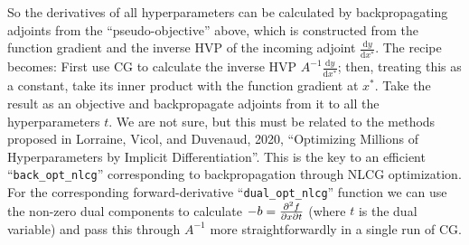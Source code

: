 \documentclass[11pt]{article}
\renewcommand{\(}{\left(}
\renewcommand{\)}{\right)}
\newcommand{\partbyby}[3]{{\partial^2 #1\over \partial #2 \partial #3}}
\newcommand{\ud}{\mathrm{d}}
\newcommand{\dby}[2]{\frac{\ud #1}{\ud #2}}
\begin{document}
So the derivatives of all hyperparameters can be calculated by
backpropagating adjoints from the ``pseudo-objective'' above, which is
constructed from the function gradient and the inverse HVP of the
incoming adjoint $\dby{y}{x^*}$. The recipe becomes: First use CG to
calculate the inverse HVP $A^{-1} \dby{y}{x^*}$; then, treating this
as a constant, take its inner product with the function gradient at
$x^*$. Take the result as an objective and backpropagate adjoints from
it to all the hyperparameters $t$. We are not sure, but this must be
related to the methods proposed in Lorraine, Vicol, and Duvenaud,
2020, ``Optimizing Millions of Hyperparameters by Implicit
Differentiation''. This is the key to an efficient
``\verb|back_opt_nlcg|'' corresponding to backpropagation through NLCG
optimization. For the corresponding forward-derivative
``\verb|dual_opt_nlcg|'' function we can use the non-zero dual
components to calculate $-b=\partbyby{f}{x}{t}$ (where $t$ is the dual
variable) and pass this through $A^{-1}$ more straightforwardly in a
single run of CG.
\end{document}
